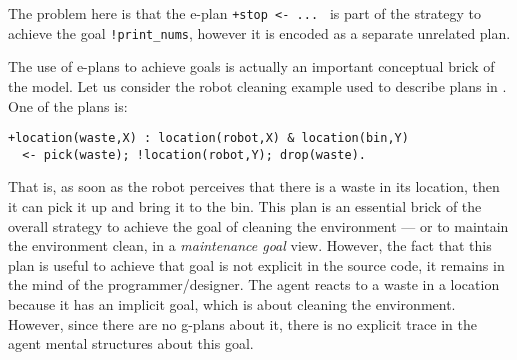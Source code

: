 \noindent The problem here is that the e-plan \texttt{+stop <- ... } is
part of the strategy to achieve the goal \texttt{!print\_nums}, however
it is encoded as a separate unrelated plan.


The use of e-plans to achieve goals is actually an important
conceptual brick of the {\asl} model.
%
Let us consider the robot cleaning example used to describe plans in
{\cite{Rao96}}.
%
One of the plans is:

\begin{small}
\begin{verbatim}
+location(waste,X) : location(robot,X) & location(bin,Y)
  <- pick(waste); !location(robot,Y); drop(waste).
\end{verbatim}
\end{small}

\noindent That is, as soon as the robot perceives that there is a
waste in its location, then it can pick it up and bring it to the bin.
%
This plan is an essential brick of the overall strategy to achieve the
goal of cleaning the environment --- or to maintain the environment
clean, in a \emph{maintenance goal} view.
%
However, the fact that this plan is useful to achieve that goal is not
explicit in the source code, it remains in the mind of the
programmer/designer.
%
%
%
%
%
The agent reacts to a waste in a location because it has an implicit
goal, which is about cleaning the environment.
%
However, since there are no g-plans about it, there is no explicit
trace in the agent mental structures about this goal.

